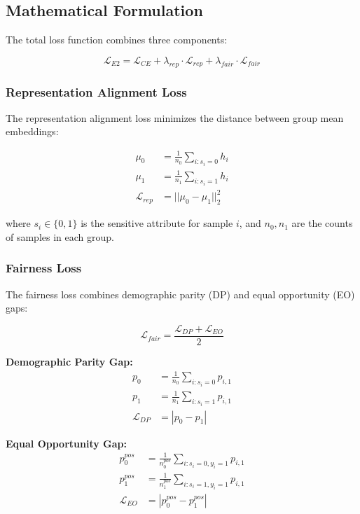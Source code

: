 \documentclass[11pt]{article}
\begin{document}
\subsection{Mathematical Formulation}

The total loss function combines three components:

\begin{equation}
    \mathcal{L}_{E2} = \mathcal{L}_{CE} + \lambda_{rep} \cdot \mathcal{L}_{rep} + \lambda_{fair} \cdot \mathcal{L}_{fair}
\end{equation}

\subsubsection{Representation Alignment Loss}
The representation alignment loss minimizes the distance between group mean embeddings:

\begin{align}
    \mu_0 &= \frac{1}{n_0} \sum_{i: s_i = 0} h_i \\
    \mu_1 &= \frac{1}{n_1} \sum_{i: s_i = 1} h_i \\
    \mathcal{L}_{rep} &= ||\mu_0 - \mu_1||_2^2
\end{align}

where $s_i \in \{0,1\}$ is the sensitive attribute for sample $i$, and $n_0, n_1$ are the counts of samples in each group.

\subsubsection{Fairness Loss}
The fairness loss combines demographic parity (DP) and equal opportunity (EO) gaps:

\begin{equation}
    \mathcal{L}_{fair} = \frac{\mathcal{L}_{DP} + \mathcal{L}_{EO}}{2}
\end{equation}

\textbf{Demographic Parity Gap:}
\begin{align}
    p_0 &= \frac{1}{n_0} \sum_{i: s_i = 0} p_{i,1} \\
    p_1 &= \frac{1}{n_1} \sum_{i: s_i = 1} p_{i,1} \\
    \mathcal{L}_{DP} &= |p_0 - p_1|
\end{align}

\textbf{Equal Opportunity Gap:}
\begin{align}
    p_0^{pos} &= \frac{1}{n_0^{pos}} \sum_{i: s_i = 0, y_i = 1} p_{i,1} \\
    p_1^{pos} &= \frac{1}{n_1^{pos}} \sum_{i: s_i = 1, y_i = 1} p_{i,1} \\
    \mathcal{L}_{EO} &= |p_0^{pos} - p_1^{pos}|
\end{align}
\end{document}
